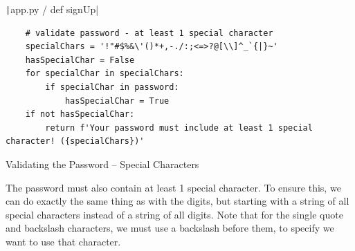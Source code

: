 \documentclass[12pt]{report}
\newcommand{\pil}[1]{\protect\texttt|#1|}
\begin{document}
\begin{listing}[H]
\pil{app.py / def signUp}
\begin{verbatim}
    # validate password - at least 1 special character
    specialChars = '!"#$%&\'()*+,-./:;<=>?@[\\]^_`{|}~'
    hasSpecialChar = False
    for specialChar in specialChars:
        if specialChar in password:
            hasSpecialChar = True
    if not hasSpecialChar:
        return f'Your password must include at least 1 special character! ({specialChars})'
\end{verbatim}
\caption{Validating the Password -- Special Characters}\label{cs:validatePasswordSpecialChars}
\end{listing}

The password must also contain at least 1 special character. To ensure this, we can do exactly the same thing as with the digits, but starting with a string of all special characters instead of a string of all digits. Note that for the single quote and backslash characters, we must use a backslash before them, to specify we want to use that character.
\end{document}
